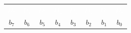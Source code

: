 \begin{tabular}{cccccccc}\rowcolor{DEplava}\textcolor{white}{$D_7$}&\textcolor{white}{$D_6$}&\textcolor{white}{$D_5$}&\textcolor{white}{$D_4$}&\textcolor{white}{$D_3$}&\textcolor{white}{$D_2$}&\textcolor{white}{$D_1$}&\textcolor{white}{$D_0$}\\\rowcolor{DEplava!12}$b_7$&$b_6$&$b_5$&$b_4$&$b_3$&$b_2$&$b_1$&$b_0$\end{tabular}